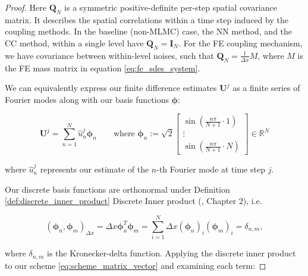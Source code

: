 \begin{proof}
Here $\mathbf{Q}_N$ is a symmetric positive-definite per-step spatial covariance matrix. It 
describes the spatial correlations within a time step induced by the coupling methods. 
In the baseline (non-MLMC) case, the NN method, and the CC method, within 
a single level have
$\mathbf{Q}_N=\mathbf{I}_N$. For the FE coupling mechanism, we have 
covariance between within-level noises, such that 
$\mathbf{Q}_N = \frac{1}{\Delta x} M$, where $M$ is the FE mass matrix
in equation \eqref{eq:fe_sdes_system}.


We can equivalently express our finite difference estimates $\mathbf{U}^j$
as a finite series of Fourier modes along with our basis functions 
$\boldsymbol{\phi}$:

\begin{equation*}
    \boldsymbol{U}^j = \sum_{n=1}^N \hat{u}_n^j \boldsymbol{\phi}_n
    \qquad \text{where }
    \boldsymbol{\phi}_n := \sqrt{2}
    \begin{bmatrix}
        \sin\left( \frac{n \pi}{N+1} \cdot 1 \right) \\
        \vdots \\
        \sin\left( \frac{n \pi}{N+1} \cdot N \right)
    \end{bmatrix}
    \in \mathbb{R}^N
\end{equation*}

where $\hat{u}_n^j$ represents our estimate of the $n$-th Fourier 
mode at time step $j$.

Our discrete basis functions are orthonormal under Definition \ref{def:discrete_inner_product}
Discrete Inner product (\cite{strang2007computational}, Chapter 2), i.e.

\begin{equation*}
    (\boldsymbol{\phi}_n, \boldsymbol{\phi}_m)_{\Delta x} 
    = \Delta x \boldsymbol{\phi}_n^T \boldsymbol{\phi}_m
    = \sum_{i=1}^N \Delta x (\boldsymbol{\phi}_n)_i (\boldsymbol{\phi}_m)_i = \delta_{n,m},
\end{equation*}

where $\delta_{n,m}$ is the Kronecker-delta function.
Applying the discrete inner product to our 
scheme \eqref{eq:scheme_matrix_vector} and examining each term:


\end{proof}

